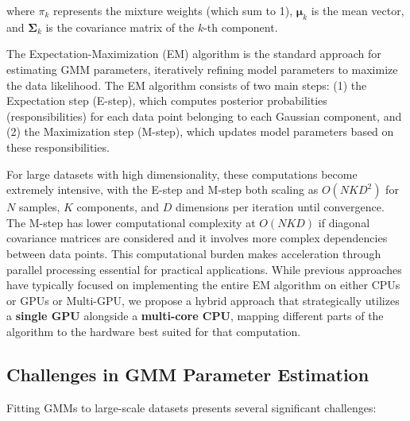\documentclass[conference]{IEEEtran}
\begin{document}
\noindent where $\pi_k$ represents the mixture weights (which sum to 1), $\boldsymbol{\mu}_k$ is the mean vector, and $\boldsymbol{\Sigma}_k$ is the covariance matrix of the $k$-th component.

The Expectation-Maximization (EM) algorithm is the standard approach for estimating GMM parameters, iteratively refining model parameters to maximize the data likelihood. The EM algorithm consists of two main steps: (1) the Expectation step (E-step), which computes posterior probabilities (responsibilities) for each data point belonging to each Gaussian component, and (2) the Maximization step (M-step), which updates model parameters based on these responsibilities.

For large datasets with high dimensionality, these computations become extremely intensive, with the E-step and M-step both scaling as $O(NKD^2)$ for $N$ samples, $K$ components, and $D$ dimensions per iteration until convergence. The M-step has lower computational complexity at $O(NKD)$ if diagonal covariance matrices are considered and it involves more complex dependencies between data points. This computational burden makes acceleration through parallel processing essential for practical applications. While previous approaches have typically focused on implementing the entire EM algorithm on either CPUs or GPUs or Multi-GPU, we propose a hybrid approach that strategically utilizes a \textbf{single GPU} alongside a \textbf{multi-core CPU}, mapping different parts of the algorithm to the hardware best suited for that computation.

\subsection{Challenges in GMM Parameter Estimation}

Fitting GMMs to large-scale datasets presents several significant challenges:
\end{document}
